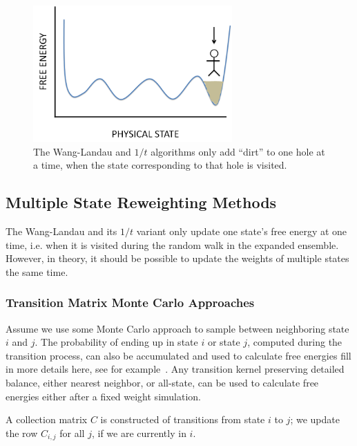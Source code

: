 \documentclass[superscriptaddress,showkeys, nofootinbib, pre, aps]{revtex4-1}
\begin{document}
\begin{figure}
    \begin{center}
        \includegraphics[width=3in]{figures/wl.png}
        \caption{The Wang-Landau and $1/t$ algorithms only add ``dirt'' to one hole at a time, when the state corresponding to that hole is visited.}
        \label{fig:wl}
    \end{center}
\end{figure}

\subsection{\label{sec:multiplestatemethods}Multiple State Reweighting Methods}

The Wang-Landau and its $1/t$ variant only update one state's free energy at one time, i.e. when it is visited during the random walk in the expanded ensemble.  However, in theory, it should be possible to update the weights of multiple states the same time.

\subsubsection{\label{sec:transition_matrix}Transition Matrix Monte Carlo Approaches}

Assume we use some Monte Carlo approach to sample between neighboring state $i$ and $j$.  The probability of ending up in state $i$ or state $j$, computed during the transition process, can also be accumulated and used to calculate free energies {\color{red}fill in more details here, see
for example~\cite{siderius_2013}}. Any transition kernel preserving detailed balance, either nearest neighbor, or all-state, can be used to calculate free energies either after a fixed weight simulation.

A collection matrix $C$ is constructed of transitions from state $i$ to $j$; we update the row $C_{i,j}$ for all $j$, if we are currently in $i$.
\end{document}
